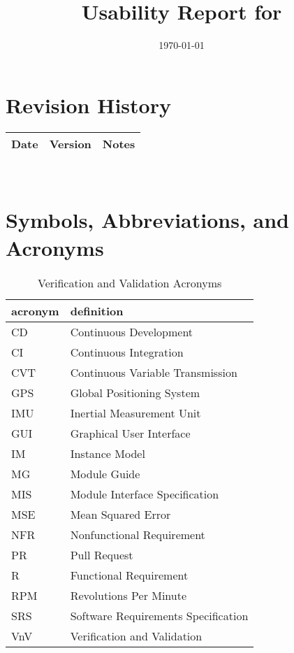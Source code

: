 \documentclass[12pt, titlepage]{article}
\begin{document}
\title{Usability Report for \progname{}} 
\author{\authname}
\date{\today}
	
\maketitle


\section*{Revision History}

\begin{tabularx}{\textwidth}{p{3cm}p{2cm}X}
\toprule {\bf Date} & {\bf Version} & {\bf Notes}\\
\midrule

\bottomrule
\end{tabularx}

~\\

\newpage

\tableofcontents

\listoftables


\listoffigures


\newpage

\section{Symbols, Abbreviations, and Acronyms}

\begin{table}[h]
  \raggedright
  \begin{tabular}{l l} 
    \toprule		
    \textbf{acronym} & \textbf{definition}\\
    \midrule
    CD & Continuous Development\\
    CI & Continuous Integration\\ 
    CVT & Continuous Variable Transmission\\
    GPS & Global Positioning System\\
    IMU & Inertial Measurement Unit\\
    GUI & Graphical User Interface\\
    IM & Instance Model\\
    MG & Module Guide\\
    MIS & Module Interface Specification\\
    MSE & Mean Squared Error\\
    NFR & Nonfunctional Requirement\\
    PR & Pull Request\\
    R & Functional Requirement\\
    RPM & Revolutions Per Minute\\
    SRS & Software Requirements Specification\\
    VnV & Verification and Validation\\
    \bottomrule
  \end{tabular}
  \caption{Verification and Validation Acronyms}
  \label{tab:vnv_acronyms}
\end{table}
\end{document}
